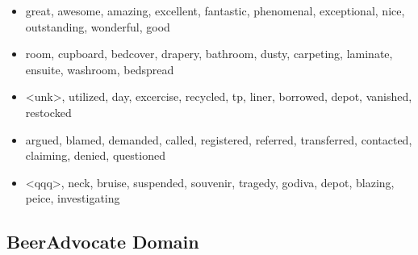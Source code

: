 \documentclass[11pt,a4paper]{article}
\begin{document}
\begin{itemize}
\item great, awesome, amazing, excellent, fantastic, phenomenal, exceptional, nice, outstanding, wonderful, good 
\item room, cupboard, bedcover, drapery, bathroom, dusty, carpeting, laminate, ensuite, washroom, bedspread 
\item <unk>, utilized, day, excercise, recycled, tp, liner, borrowed, depot, vanished, restocked 
\item argued, blamed, demanded, called, registered, referred, transferred, contacted, claiming, denied, questioned 
\item <qqq>, neck, bruise, suspended, souvenir, tragedy, godiva, depot, blazing, peice, investigating 
\end{itemize}

\subsection{BeerAdvocate Domain}
\end{document}
